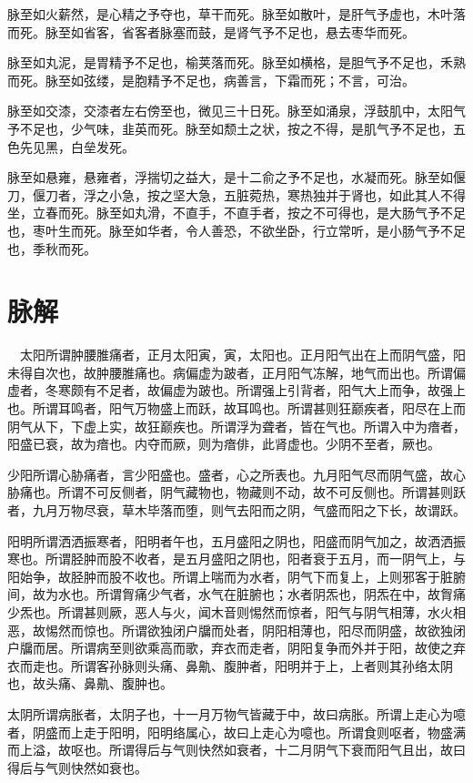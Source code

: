 \documentclass{article}%
\begin{document}
脉至如火薪然，是心精之予夺也，草干而死。脉至如散叶，是肝气予虚也，木叶落而死。脉至如省客，省客者脉塞而鼓，是肾气予不足也，悬去枣华而死。

脉至如丸泥，是胃精予不足也，榆荚落而死。脉至如横格，是胆气予不足也，禾熟而死。脉至如弦缕，是胞精予不足也，病善言，下霜而死；不言，可治。

脉至如交漆，交漆者左右傍至也，微见三十日死。脉至如涌泉，浮鼓肌中，太阳气予不足也，少气味，韭英而死。脉至如颓土之状，按之不得，是肌气予不足也，五色先见黑，白垒发死。

脉至如悬雍，悬雍者，浮揣切之益大，是十二俞之予不足也，水凝而死。脉至如偃刀，偃刀者，浮之小急，按之坚大急，五脏菀热，寒热独并于肾也，如此其人不得坐，立春而死。脉至如丸滑，不直手，不直手者，按之不可得也，是大肠气予不足也，枣叶生而死。脉至如华者，令人善恐，不欲坐卧，行立常听，是小肠气予不足也，季秋而死。
\section{脉解}
　太阳所谓肿腰脽痛者，正月太阳寅，寅，太阳也。正月阳气出在上而阴气盛，阳未得自次也，故肿腰脽痛也。病偏虚为跛者，正月阳气冻解，地气而出也。所谓偏虚者，冬寒颇有不足者，故偏虚为跛也。所谓强上引背者，阳气大上而争，故强上也。所谓耳鸣者，阳气万物盛上而跃，故耳鸣也。所谓甚则狂巅疾者，阳尽在上而阴气从下，下虚上实，故狂巅疾也。所谓浮为聋者，皆在气也。所谓入中为瘖者，阳盛已衰，故为瘖也。内夺而厥，则为瘖俳，此肾虚也。少阴不至者，厥也。

少阳所谓心胁痛者，言少阳盛也。盛者，心之所表也。九月阳气尽而阴气盛，故心胁痛也。所谓不可反侧者，阴气藏物也，物藏则不动，故不可反侧也。所谓甚则跃者，九月万物尽衰，草木毕落而堕，则气去阳而之阴，气盛而阳之下长，故谓跃。

阳明所谓洒洒振寒者，阳明者午也，五月盛阳之阴也，阳盛而阴气加之，故洒洒振寒也。所谓胫肿而股不收者，是五月盛阳之阴也，阳者衰于五月，而一阴气上，与阳始争，故胫肿而股不收也。所谓上喘而为水者，阴气下而复上，上则邪客于脏腑间，故为水也。所谓胷痛少气者，水气在脏腑也；水者阴炁也，阴炁在中，故胷痛少炁也。所谓甚则厥，恶人与火，闻木音则惕然而惊者，阳气与阴气相薄，水火相恶，故惕然而惊也。所谓欲独闭户牖而处者，阴阳相薄也，阳尽而阴盛，故欲独闭户牖而居。所谓病至则欲乘高而歌，弃衣而走者，阴阳复争而外并于阳，故使之弃衣而走也。所谓客孙脉则头痛、鼻鼽、腹肿者，阳明并于上，上者则其孙络太阴也，故头痛、鼻鼽、腹肿也。

太阴所谓病胀者，太阴子也，十一月万物气皆藏于中，故曰病胀。所谓上走心为噫者，阴盛而上走于阳明，阳明络属心，故曰上走心为噫也。所谓食则呕者，物盛满而上溢，故呕也。所谓得后与气则快然如衰者，十二月阴气下衰而阳气且出，故曰得后与气则快然如衰也。
\end{document}
